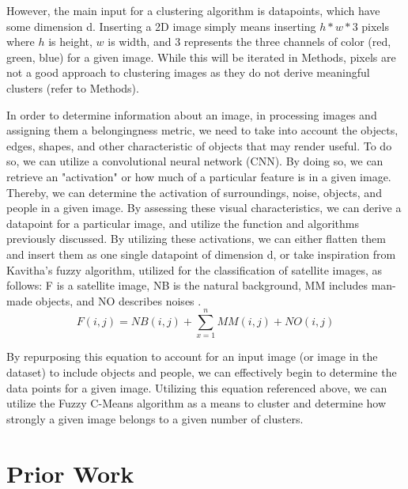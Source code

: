 \documentclass[10pt,twocolumn]{article}
\begin{document}
However, the main input for a clustering algorithm is datapoints, which have some dimension d. Inserting a 2D image simply means inserting \( h * w * 3\) pixels where \(h\) is height, \(w\) is width, and 3 represents the three channels of color (red, green, blue) for a given image. While this will be iterated in Methods, pixels are not a good approach to clustering images as they do not derive meaningful clusters (refer to Methods).

In order to determine information about an image, in processing images and assigning them a belongingness metric, we need to take into account the objects, edges, shapes, and other characteristic of objects that may render useful. To do so, we can utilize a convolutional neural network (CNN). By doing so, we can retrieve an "activation" or how much of a particular feature is in a given image. Thereby, we can determine the activation of surroundings, noise, objects, and people in a given image. By assessing these visual characteristics, we can derive a datapoint for a particular image, and utilize the function and algorithms previously discussed.
By utilizing these activations, we can either flatten them and insert them as one single datapoint of dimension d, or take inspiration from Kavitha’s fuzzy algorithm, utilized for the classification of satellite images, as follows: F is a satellite image, NB is the natural background, MM includes man-made objects, and NO describes noises \cite{Kavitha2020}.
\[F(i, j) = NB(i,j) + \sum_{x=1}^{n} MM(i, j) + NO(i, j) \]

By repurposing this equation to account for an input image (or image in the dataset) to include objects and people, we can effectively begin to determine the data points for a given image. Utilizing this equation referenced above, we can utilize the Fuzzy C-Means algorithm as a means to cluster and determine how strongly a given image belongs to a given number of clusters.

\section{Prior Work}
\end{document}

